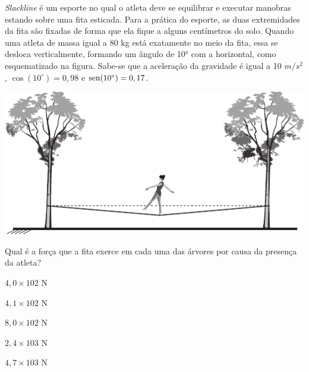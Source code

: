 \questao
\textit{Slackline} é um esporte no qual o atleta deve se equilibrar e executar manobras estando sobre uma fita esticada. Para a prática do esporte, as duas extremidades da fita são fixadas de forma que ela fique a alguns centímetros do solo. Quando uma atleta de massa igual a 80 kg está exatamente no meio da fita, essa se desloca verticalmente, formando um ângulo de 10° com a horizontal, como esquematizado na figura. Sabe-se que a aceleração da gravidade é igual a 10 $m/s^2$, $\cos (10^\circ) = 0,98$ e $\operatorname{sen} (10^{\circ}) = 0,17$.
\begin{center}
\includegraphics[width=\columnwidth]{subareas/ciencias_natureza/fisica-2.pdf}
\end{center}
Qual é a força que a fita exerce em cada uma das árvores por causa da presença da atleta?
\begin{alternativas}
\item $4,0 \times 102$ N
\item $4,1 \times 102$ N
\item $8,0 \times 102$ N
\item $2,4 \times 103$ N
\item $4,7 \times 103$ N
\end{alternativas}

